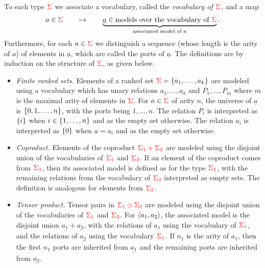 \begin{definition} \label{def:type-model} To each type  ${\color{red}{\Sigma}}$ we associate a vocabulary, called the \emph{vocabulary of ${\color{red}{\Sigma}}$}, and a map 
    \begin{align*}
        a \in {\color{red}{\Sigma}} \qquad \mapsto \qquad \underbrace{\underline a \in \text{models over the  vocabulary of  ${\color{red}{\Sigma}}$}}_{\text{associated model of $a$}}.
    \end{align*}
    Furthermore, for each $a \in {\color{red}{\Sigma}}$ we  distinguish a  sequence (whose length is the arity of $a$) of elements in $\underline a$, which are called the ports of $\underline a$.   The definitions are by induction on the structure of ${\color{red}{\Sigma}}$, as given below.
    \begin{itemize}
        \item \emph{Finite ranked sets.} Elements of a ranked set   ${\color{red}{\Sigma}} =  \{a_1,\ldots,a_k\}$ are modeled  using a vocabulary which has unary relations $a_1,\ldots,a_k$ and $P_1,\ldots,P_m$ where $m$ is the maximal arity of elements in ${\color{red}{\Sigma}}$. 
        For $a \in {\color{red}{\Sigma}}$ of arity $n$, the  universe of $\underline a$ is $\{0,1,\ldots,n\}$, with the ports being $1,\ldots,n$. 
            The  relation $P_i$  is interpreted as $\{i\}$ when $i \in \{1,\ldots,n\}$ and as the empty set otherwise. The relation $a_i$ is interpreted as $\{0\}$ when $a = a_i$ and as the empty set otherwise. 
        \item \emph{Coproduct.}  Elements of the coproduct ${\color{red}{\Sigma_1 + \Sigma_2}}$ are modeled using the disjoint union of the vocabularies of ${\color{red}{\Sigma_1}}$ and ${\color{red}{\Sigma_2}}$. 
            If an element of the coproduct comes from ${\color{red}{\Sigma_1}}$, then its associated model is defined as for the type ${\color{red}{\Sigma_1}}$, with  the remaining relations from the vocabulary of   ${\color{red}{\Sigma_2}}$ interpreted   as empty sets. The definition is analogous for  elements from ${\color{red}{\Sigma_2}}$. 
        \item \emph{Tensor product.}   Tensor pairs in   ${\color{red}{\Sigma_1 \otimes \Sigma_2}}$ are modeled
        using the disjoint union of the vocabularies of ${\color{red}{\Sigma_1}}$ and ${\color{red}{\Sigma_2}}$. 
            For  $\langle{a_1,a_2}\rangle$, the associated model is    the disjoint union $\underline{a_1} + \underline {a_2}$, with the relations of $\underline {a_1}$ using the  vocabulary of ${{\color{red}{\Sigma_1}}}$, and the relations of $\underline {a_2}$ using the vocabulary  ${{\color{red}{\Sigma_1}}}$. 
            If $n_1$ is the arity of $a_1$, then the first $n_1$ ports are inherited from  $\underline {a_1}$ and the remaining ports are inherited from  $\underline {a_2}$.

\end{itemize}
\end{definition}
